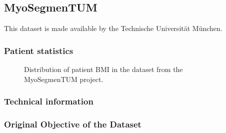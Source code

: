 \subsection{MyoSegmenTUM}

This dataset is made available by the Technische Universität München.

\subsubsection{Patient statistics}


\begin{SCfigure}[][htb]
    \centering
    
    \caption{Distribution of patient BMI in the dataset from the MyoSegmenTUM project.}
\end{SCfigure}

\subsubsection{Technical information}

\subsubsection{Original Objective of the Dataset}